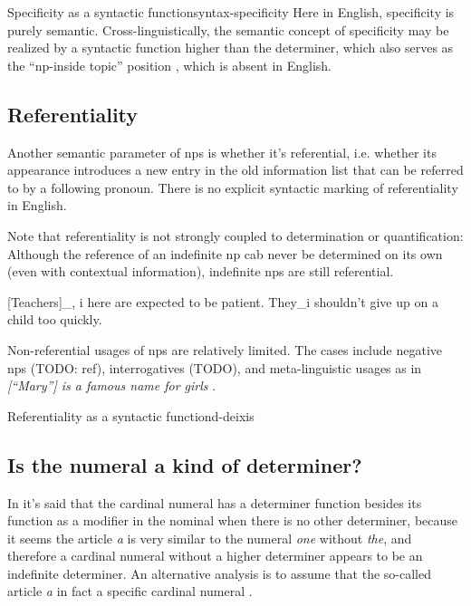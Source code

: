 \documentclass[UTF8, a4paper, oneside, scheme=plain, 12pt]{ctexbook}
\newcommand*{\citesec}[1]{\S~{#1}}
\newcommand*{\citepage}[1]{p.~{#1}}
\newcommand{\form}[1]{\emph{#1}}
\begin{document}
\begin{infobox}{Specificity as a syntactic function}{syntax-specificity}
    Here in English, 
    specificity is purely semantic.
    Cross-linguistically, the semantic concept of specificity 
    may be realized by a syntactic function
    higher than the determiner,
    which also serves as the ``\acs{np}-inside topic'' position 
    \citep{ihsane2001specific},
    which is absent in English.
\end{infobox}


\subsection{Referentiality}\label{sec:np.det.deixis}

Another semantic parameter of \acs{np}s is whether it's referential,
i.e. whether its appearance introduces a new entry in the old information list 
that can be referred to by a following pronoun.
There is no explicit syntactic marking of referentiality in English.

Note that referentiality is not strongly coupled to determination or quantification:
Although the reference of an indefinite \acs{np} cab never be determined on its own 
(even with contextual information),
indefinite \acs{np}s are still referential.

\begin{exe}
    \ex {} [Teachers]_{, i} here are expected to be patient. 
    They_i shouldn't give up on a child too quickly.
\end{exe}

Non-referential usages of \acs{np}s are relatively limited.
The cases include negative \acs{np}s (TODO: ref), 
interrogatives (TODO), 
and meta-linguistic usages as in \form{[``Mary''] is a famous name for girls}
\citep[\citepage{400}]{cgel}.

\begin{infobox}{Referentiality as a syntactic function}{d-deixis}
    
\end{infobox}

\subsection{Is the numeral a kind of determiner?}\label{sec:np.det.num}

In \citet[\citepage{355}, {[2ii]}]{cgel}
it's said that the cardinal numeral has 
a determiner function besides its function as a modifier in the nominal
when there is no other determiner,
because it seems the article \form{a} is very similar to 
the numeral \form{one} without \form{the},
and therefore a cardinal numeral without a higher determiner 
appears to be an indefinite determiner.
An alternative analysis is to assume that 
the so-called article \form{a} in fact a specific cardinal numeral
\citep[\citesec{2.5}]{lyons1999definiteness}.
\end{document}
